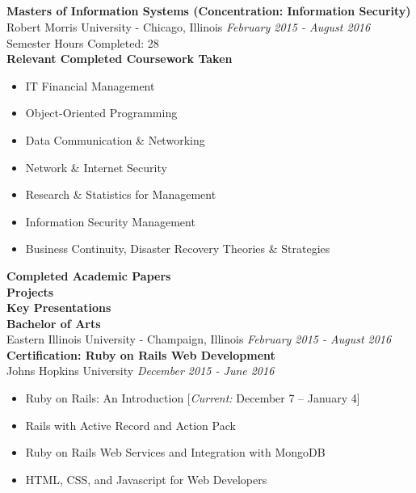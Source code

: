 \documentclass[a4papper,overlapped,line]{res}
\newcommand{\jobdes}[3]{{\bf \large #1\hspace{2ex}}{{\em \small #2}}{\hfill #3}}
\newcommand{\osection}[1]{\section{\sc {\color{MidnightBlue}\vspace{-0.60cm} \textbf{#1}\\}}}
\begin{document}
\begin{resume}
\osection{EDUCATION}
\vspace{0.7cm}
\jobdes{Masters of Information Systems (Concentration: Information Security)}\\
{Robert Morris University - Chicago, Illinois  }{\textit{February 2015 - August 2016}}\\
Semester Hours Completed: 28 \vspace{0.2cm}
\\
\textbf{Relevant Completed Coursework Taken}\\
\begin{itemize}
	\item IT Financial Management
	\item Object-Oriented Programming
	\item Data Communication \& Networking
	\item Network \& Internet Security
	\item Research \& Statistics for Management
	\item Information Security Management
	\item Business Continuity, Disaster Recovery Theories \& Strategies
\end{itemize}
\textbf{Completed Academic Papers}\\
\textbf{Projects}\\
\textbf{Key Presentations}\\
\linebreak 
\linebreak
\jobdes{Bachelor of Arts}\\
{Eastern Illinois University - Champaign, Illinois  }{\textit{February 2015 - August 2016}}\\
\linebreak
\linebreak
\jobdes{Certification: Ruby on Rails Web Development}\\
{Johns Hopkins University }{\textit{December 2015 - June 2016}}
\begin{itemize}
	\item Ruby on Rails: An Introduction [\textit{Current:} December 7 – January 4]
	\item Rails with Active Record and Action Pack
	\item Ruby on Rails Web Services and Integration with MongoDB
	\item HTML, CSS, and Javascript for Web Developers

\end{itemize}
\end{resume}
\end{document}
